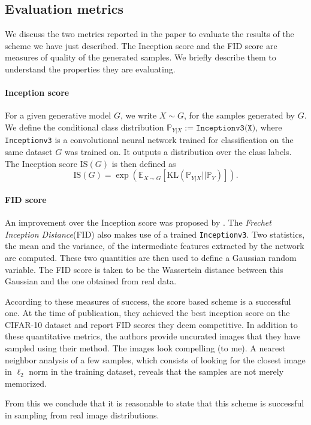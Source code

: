 \documentclass[11pt,twoside]{article}
\theoremstyle{definition}
\newcommand{\Prb}{\mathbb{P}}
\newcommand{\E}{\mathbb{E}}
\newcommand{\KL}{\text{KL}}
\begin{document}
\subsection{Evaluation metrics}

We discuss the two metrics reported in the paper to evaluate the results of the scheme we have just described. The Inception score and the FID score are measures of quality of the generated samples. We briefly describe them to understand the properties they are evaluating.

\paragraph{Inception score} \cite{salimans_improved_2016} For a given generative model $G$, we write $X \sim G$, for the samples generated by $G$. We define the conditional class distribution $\Prb_{Y|X} := \texttt{Inceptionv3(X)}$, where \texttt{Inceptionv3} is a convolutional neural network trained for classification on the same dataset $G$ was trained on. It outputs a distribution over the class labels. The Inception score IS$(G)$ is then defined as 
\[
\text{IS}(G) = \exp \left(\E_{X \sim G} [\KL(\Prb_{Y|X} || \Prb_Y)] \right).
\]

\paragraph{FID score}  An improvement over the Inception score was proposed by \cite{heusel_gans_2017}. The \textit{Frechet Inception Distance}(FID) also makes use of a trained \texttt{Inceptionv3}. Two statistics, the mean and the variance, of the intermediate features extracted by the network are computed. These two quantities are then used to define a Gaussian random variable. The FID score is taken to be the Wassertein distance between this Gaussian and the one obtained from real data.

According to these measures of success, the score based scheme is a successful one. At the time of publication, they achieved the best inception score on the CIFAR-10 dataset and report FID scores they deem competitive. In addition to these quantitative metrics, the authors provide uncurated images that they have sampled using their method. The images look compelling (to me). A nearest neighbor analysis of a few samples, which consists of looking for the closest image in $\ell_2$ norm in the training dataset, reveals that the samples are not merely memorized.

From this we conclude that it is reasonable to state that this scheme is successful in sampling from real image distributions.
\end{document}
